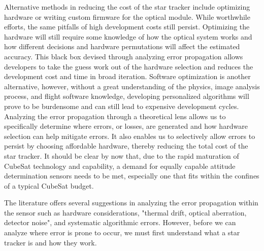 \par \qquad Alternative methods in reducing the cost of the star tracker include optimizing hardware or writing custom firmware for the optical module.
While worthwhile efforts, the same pitfalls of high development costs still persist.
Optimizing the hardware will still require some knowledge of how the optical system works and how different decisions and hardware permutations will affect the estimated accuracy.
This black box devised through analyzing error propagation allows developers to take the guess work out of the hardware selection and reduces the development cost and time in broad iteration.
Software optimization is another alternative, however, without a great understanding of the physics, image analysis process, and flight software knowledge, developing personalized algorithms will prove to be burdensome and can still lead to expensive development cycles.
Analyzing the error propagation through a theoretical lens allows us to specifically determine where errors, or losses, are generated and how hardware selection can help mitigate errors. 
It also enables us to selectively allow errors to persist by choosing affordable hardware, thereby reducing the total cost of the star tracker.
It should be clear by now that, due to the rapid maturation of CubeSat technology and capability, a demand for equally capable attitude determination sensors needs to be met, especially one that fits within the confines of a typical CubeSat budget.

\par \qquad The literature offers several suggestions in analyzing the error propagation within the sensor such as hardware considerations, "thermal drift, optical aberration, detector noise"\cite{systematic_error_analysis_of_star_tracker_centroiding}, and systematic algorithmic errors.
However, before we can analyze where error is prone to occur, we must first understand what a star tracker is and how they work.
